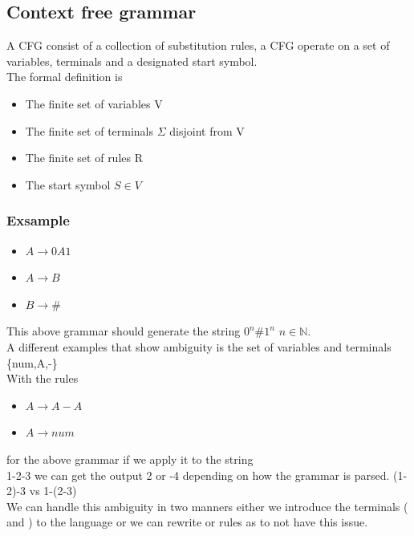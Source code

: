 \documentclass[a4paper,10pt,titlepage]{report}
\begin{document}
\subsection{Context free grammar}
A CFG consist of a collection of substitution rules, a CFG operate on a set of variables, terminals and a designated start symbol.\\
The formal definition is
\begin{itemize}
\item The finite set of variables V
\item The finite set of terminals $\Sigma$ disjoint from V
\item The finite set of rules R
\item The start symbol $S \in V$
\end{itemize}
\subsubsection{Exsample}
 \begin{multicols}{3}
\begin{itemize}
\item $A \rightarrow 0A1$
\item $A \rightarrow B$
\item $B \rightarrow \# $
\end{itemize}
\end{multicols}
 
This above grammar should generate the string $0^n\#1^n$ $n \in \mathbb{N} $.\\

A different examples that show ambiguity is the set of variables and terminals \{num,A,-\}\\
With the rules\
 \begin{multicols}{3}
\begin{itemize}
\item $A \rightarrow A-A $
\item $A \rightarrow num$
\end{itemize}
\end{multicols}

for the above grammar if we apply it to the string\\
1-2-3 we can get the output 2 or -4 depending on how the grammar is parsed. (1-2)-3 vs 1-(2-3)\\
We can handle this ambiguity in two manners either we introduce the terminals ( and ) to the language or we can rewrite or rules as to not have this issue.\\
\end{document}
